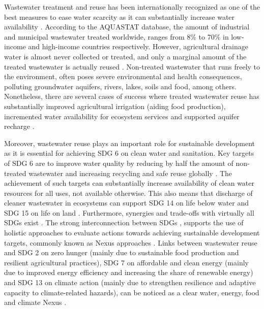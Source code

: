 Wastewater treatment and reuse has been internationally recognized as one of the best measures to ease water scarcity as it can substantially increase water availability \cite{unescoWastewaterUntappedResource2017,GARCIA2015154}. According to the AQUASTAT database, the amount of industrial and municipal wastewater treated worldwide, ranges from 8\% to 70\% in low-income and high-income countries respectively. However, agricultural drainage water is almost never collected or treated, and only a marginal amount of the treated wastewater is actually reused \cite{unescoWastewaterUntappedResource2017}. Non-treated wastewater that runs freely to the environment, often poses severe environmental and health consequences, polluting groundwater aquifers, rivers, lakes, soils and food, among others. Nonetheless, there are several cases of success where treated wastewater reuse has substantially improved agricultural irrigation (aiding food production), incremented water availability for ecosystem services and supported aquifer recharge \cite{hettiarachchiSAFEUSEWASTEWATERa, halalshehPolicyGovernanceFramework2018, mahjoubPublicAcceptanceWastewater2018, zuurbierUseWastewaterManaged2018, hussainSustainableUseManagement2019}.

Moreover, wastewater reuse plays an important role for sustainable development as it is essential for achieving SDG 6 on clean water and sanitation. Key targets of SDG 6 are to improve water quality by reducing by half the amount of non-treated wastewater and increasing recycling and safe reuse globally \cite{UNSDGs2019, tortajadaContributionsRecycledWastewater2020}. The achievement of such targets can substantially increase availability of clean water resources for all uses, not available otherwise. This also means that discharge of cleaner wastewater in ecosystems can support SDG 14 on life below water and SDG 15 on life on land \cite{UNSDGs2019, tortajadaContributionsRecycledWastewater2020}. Furthermore, synergies and trade-offs with virtually all SDGs exist \cite{WaterSanitationInterlinkages2016}. The strong interconnection between SDGs \cite{WaterSanitationInterlinkages2016,fusoneriniMappingSynergiesTradeoffs2018,fusoneriniConnectingClimateAction2019}, supports the use of holistic approaches to evaluate actions towards achieving sustainable development targets, commonly known as Nexus approaches \cite{liuNexusApproachesGlobal2018,bleischwitzResourceNexusPerspectives2018}. Links between wastewater reuse and SDG 2 on zero hunger (mainly due to sustainable food production and resilient agricultural practices), SDG 7 on affordable and clean energy (mainly due to improved energy efficiency and increasing the share of renewable energy) and SDG 13 on climate action (mainly due to strengthen resilience and adaptive capacity to climate-related hazards), can be noticed as a clear water, energy, food and climate Nexus \cite{WaterSanitationInterlinkages2016,liuNexusApproachesGlobal2018}.

